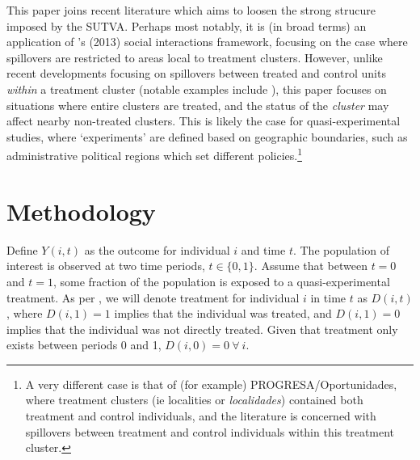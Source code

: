 \documentclass{article}
\begin{document}
\begin{spacing}{1.1}
This paper joins recent literature which aims to loosen the strong strucure 
imposed by the SUTVA.  Perhaps most notably, it is (in broad terms) an 
application of \citeauthor{Manski2013}'s (2013) social interactions framework, 
focusing on the case where spillovers are restricted to areas local to treatment 
clusters.  However, unlike recent developments focusing on spillovers 
between treated and control units \emph{within} a treatment cluster (notable
examples include \citet{McIntosh2008,Bairdetal2014,AngelucciDiMaro2010}), this 
paper focuses on situations where entire clusters are treated, and the status
of the \emph{cluster} may affect nearby non-treated clusters.  This is likely
the case for quasi-experimental studies, where `experiments' are defined based
on geographic boundaries, such as administrative political regions which set 
different policies.\footnote{A very different case is that of (for example)
PROGRESA/Oportunidades, where treatment clusters (ie localities or 
\emph{localidades}) contained both treatment and control individuals, and the
literature is concerned with spillovers between treatment and control individuals
within this treatment cluster.}

\nocite{AngelucciDeGiorgi2009} \nocite{Heckmanetal1998}
\nocite{MiguelKremer2004}
 \nocite{Heckmanetal1998b}

\section{Methodology}
Define $Y(i,t)$ as the outcome for individual $i$ and time $t$.  The population
of interest is observed at two time periods, $t\in \{0,1\}$. Assume that between
$t=0$ and $t=1$, some fraction of the population is exposed to a 
quasi-experimental treatment.  As per \citet{Abadie2005}, we will denote 
treatment for individual $i$ in time $t$ as $D(i,t)$, where $D(i,1)=1$ implies 
that the individual was treated, and $D(i,1)=0$ implies that the individual was
not directly treated.  Given that treatment only exists between periods 0 and 1,
$D(i,0)=0\ \forall\ i$.


\end{spacing}
\end{document}
